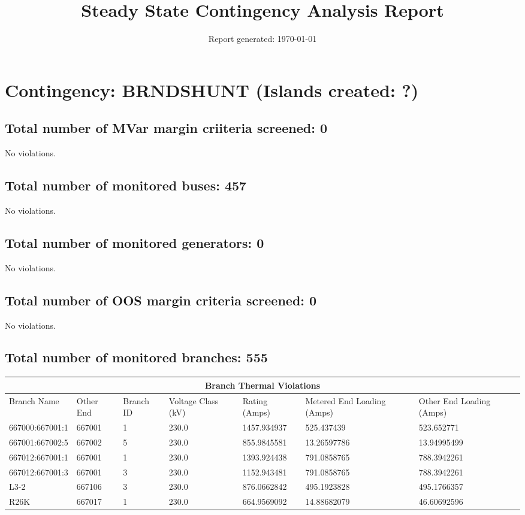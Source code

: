 \documentclass{article}%
\title{Steady State Contingency Analysis Report\vspace{-3ex}}%
\date{Report generated: \today\vspace{-2ex}}%
\begin{document}
%
\normalsize%
\maketitle%
\section*{Contingency: BRNDSHUNT (Islands created: ?)}%
\label{sec:ContingencyBRNDSHUNT(Islandscreated?)}%
\subsection*{Total number of MVar margin criiteria screened: 0}%
\label{subsec:TotalnumberofMVarmargincriiteriascreened0}%
No violations.

%
\subsection*{Total number of monitored buses: 457}%
\label{subsec:Totalnumberofmonitoredbuses457}%
No violations.

%
\subsection*{Total number of monitored generators: 0}%
\label{subsec:Totalnumberofmonitoredgenerators0}%
No violations.

%
\subsection*{Total number of OOS margin criteria screened: 0}%
\label{subsec:TotalnumberofOOSmargincriteriascreened0}%
No violations.

%
\subsection*{Total number of monitored branches: 555}%
\label{subsec:Totalnumberofmonitoredbranches555}%
\begin{tabularx}{\textwidth}{| X | X | X | X | X | X | X |}%
\hline%
\multicolumn{7}{|c|}{Branch Thermal Violations}\\%
\hline%
Branch Name&Other End&Branch ID&Voltage Class (kV)&Rating (Amps)&Metered End Loading (Amps)&Other End Loading (Amps)\\%
\hline%
667000:667001:1&667001&1&230.0&1457.934937&525.437439&523.652771\\%
\hline%
\hline%
667001:667002:5&667002&5&230.0&855.9845581&13.26597786&13.94995499\\%
\hline%
\hline%
667012:667001:1&667001&1&230.0&1393.924438&791.0858765&788.3942261\\%
\hline%
\hline%
667012:667001:3&667001&3&230.0&1152.943481&791.0858765&788.3942261\\%
\hline%
\hline%
L3{-}2&667106&3&230.0&876.0662842&495.1923828&495.1766357\\%
\hline%
\hline%
R26K&667017&1&230.0&664.9569092&14.88682079&46.60692596\\%
\hline%
\end{tabularx}
\end{document}
